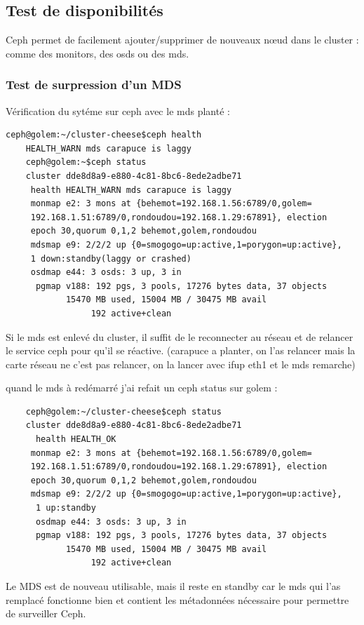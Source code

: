 \documentclass[12pt]{article}
\begin{document}
	\subsection{Test de disponibilités}
	Ceph permet de facilement ajouter/supprimer de nouveaux nœud dans le cluster : comme des monitors, des osds ou des mds.

	\subsubsection{Test de surpression d'un MDS}
	Vérification du sytéme sur ceph avec le mds planté :
\begin{verbatim}
ceph@golem:~/cluster-cheese$ceph health 
    HEALTH_WARN mds carapuce is laggy  
    ceph@golem:~$ceph status     
    cluster dde8d8a9-e880-4c81-8bc6-8ede2adbe71
     health HEALTH_WARN mds carapuce is laggy 
     monmap e2: 3 mons at {behemot=192.168.1.56:6789/0,golem=
     192.168.1.51:6789/0,rondoudou=192.168.1.29:67891}, election 
     epoch 30,quorum 0,1,2 behemot,golem,rondoudou 
     mdsmap e9: 2/2/2 up {0=smogogo=up:active,1=porygon=up:active}, 
     1 down:standby(laggy or crashed)
     osdmap e44: 3 osds: 3 up, 3 in 
      pgmap v188: 192 pgs, 3 pools, 17276 bytes data, 37 objects 
            15470 MB used, 15004 MB / 30475 MB avail 
                 192 active+clean 
\end{verbatim}
	Si le mds est enlevé du cluster, il suffit de le reconnecter au réseau et de relancer le service ceph pour qu'il se réactive.
(carapuce  a planter,  on l'as relancer mais la carte réseau ne c'est pas relancer, on la lancer avec ifup eth1 et le mds remarche)

quand le mds à redémarré j'ai refait un ceph status sur golem :
\begin{verbatim}
    ceph@golem:~/cluster-cheese$ceph status     
    cluster dde8d8a9-e880-4c81-8bc6-8ede2adbe71
      health HEALTH_OK  
     monmap e2: 3 mons at {behemot=192.168.1.56:6789/0,golem=
     192.168.1.51:6789/0,rondoudou=192.168.1.29:67891}, election 
     epoch 30,quorum 0,1,2 behemot,golem,rondoudou 
     mdsmap e9: 2/2/2 up {0=smogogo=up:active,1=porygon=up:active},
      1 up:standby
      osdmap e44: 3 osds: 3 up, 3 in 
      pgmap v188: 192 pgs, 3 pools, 17276 bytes data, 37 objects 
            15470 MB used, 15004 MB / 30475 MB avail 
                 192 active+clean 
\end{verbatim}

Le MDS est de nouveau utilisable, mais il reste en standby car le mds qui l'as remplacé fonctionne bien et contient les métadonnées nécessaire pour permettre de surveiller Ceph.
\end{document}
